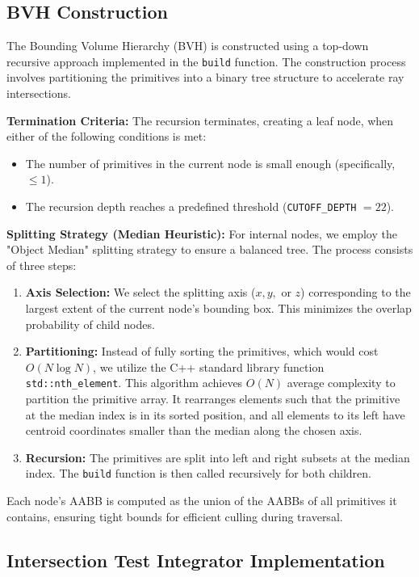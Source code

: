 \documentclass[acmtog]{acmart}
\begin{document}
\subsection{BVH Construction}

The Bounding Volume Hierarchy (BVH) is constructed using a top-down recursive approach implemented in the \texttt{build} function. The construction process involves partitioning the primitives into a binary tree structure to accelerate ray intersections.

\textbf{Termination Criteria:}
The recursion terminates, creating a leaf node, when either of the following conditions is met:
\begin{itemize}
    \item The number of primitives in the current node is small enough (specifically, $\le 1$).
    \item The recursion depth reaches a predefined threshold (\texttt{CUTOFF\_DEPTH} $= 22$).
\end{itemize}

\textbf{Splitting Strategy (Median Heuristic):}
For internal nodes, we employ the "Object Median" splitting strategy to ensure a balanced tree. The process consists of three steps:
\begin{enumerate}
    \item \textbf{Axis Selection:} We select the splitting axis ($x, y,$ or $z$) corresponding to the largest extent of the current node's bounding box. This minimizes the overlap probability of child nodes.
    \item \textbf{Partitioning:} Instead of fully sorting the primitives, which would cost $O(N \log N)$, we utilize the C++ standard library function \texttt{std::nth\_element}. This algorithm achieves $O(N)$ average complexity to partition the primitive array. It rearranges elements such that the primitive at the median index is in its sorted position, and all elements to its left have centroid coordinates smaller than the median along the chosen axis.
    \item \textbf{Recursion:} The primitives are split into left and right subsets at the median index. The \texttt{build} function is then called recursively for both children.
\end{enumerate}

Each node's AABB is computed as the union of the AABBs of all primitives it contains, ensuring tight bounds for efficient culling during traversal.
\subsection{Intersection Test Integrator Implementation}
\end{document}
